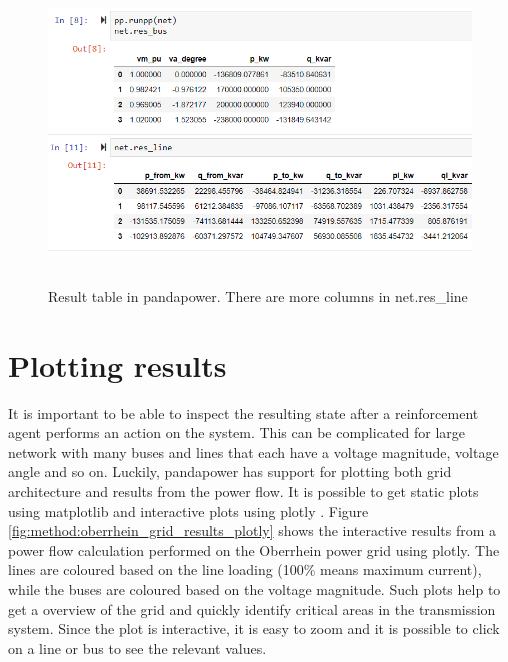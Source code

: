 \documentclass[class=book, crop=false]{standalone}
\begin{document}
\begin{figure}[H]
    \includegraphics[height=8cm, width=14cm]{figures/case4g_line_bus_res.PNG}
    \caption[size = 9]{Result table in pandapower. There are more columns in net.res\_line}
    \label{fig:method:res_line_bus_dataframe}
\end{figure}

\section{Plotting results}
It is important to be able to inspect the resulting state after a reinforcement agent performs an action on the system. This can be complicated for large network with many buses and lines that each have a voltage magnitude, voltage angle and so on. Luckily, pandapower has support for plotting both grid architecture and results from the power flow. It is possible to get static plots using matplotlib and interactive plots using plotly \cite{plotly}. Figure \ref{fig:method:oberrhein_grid_results_plotly} shows the interactive results from a power flow calculation performed on the Oberrhein power grid using plotly. The lines are coloured based on the line loading (100\% means maximum current), while the buses are coloured based on the voltage magnitude. Such plots help to get a overview of the grid and quickly identify critical areas in the transmission system. Since the plot is interactive, it is easy to zoom and it is possible to click on a line or bus to see the relevant values. 
\end{document}
